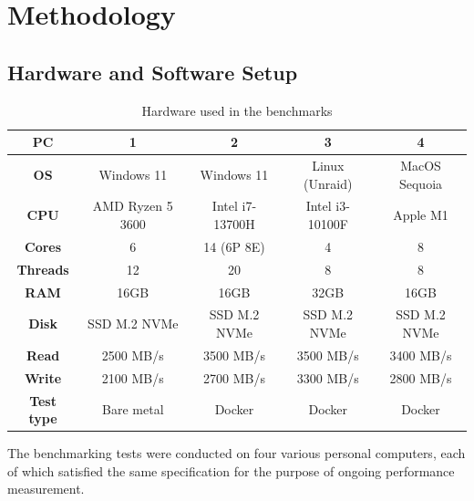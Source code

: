\section{Methodology}
\label{sec:methodology}

\subsection{Hardware and Software Setup}
\label{sec:hardware-software-setup}

\begin{table}[h!]
    \centering
    \begin{tabular}{|c|c|c|c|c|}
        \hline
        \textbf{PC}        & \textbf{1}       & \textbf{2}      & \textbf{3}      & \textbf{4}    \\
        \hline
        \textbf{OS}        & Windows 11       & Windows 11      & Linux (Unraid)  & MacOS Sequoia \\
        \hline
        \textbf{CPU}       & AMD Ryzen 5 3600 & Intel i7-13700H & Intel i3-10100F & Apple M1      \\
        \hline
        \textbf{Cores}     & 6                & 14 (6P 8E)      & 4               & 8             \\
        \hline
        \textbf{Threads}   & 12               & 20              & 8               & 8             \\
        \hline
        \textbf{RAM}       & 16GB             & 16GB            & 32GB            & 16GB          \\
        \hline
        \textbf{Disk}      & SSD M.2 NVMe     & SSD M.2 NVMe    & SSD M.2 NVMe    & SSD M.2 NVMe  \\
        \hline
        \textbf{Read}      & 2500 MB/s        & 3500 MB/s       & 3500 MB/s       & 3400 MB/s     \\
        \hline
        \textbf{Write}     & 2100 MB/s        & 2700 MB/s       & 3300 MB/s       & 2800 MB/s     \\
        \hline
        \textbf{Test type} & Bare metal       & Docker          & Docker          & Docker        \\
        \hline
    \end{tabular}
    \caption{Hardware used in the benchmarks}
    \label{tab:hardware-setup}
\end{table}

\pagebreak

The benchmarking tests were conducted on four various personal computers, each of which satisfied the same specification for the purpose of ongoing performance measurement.

